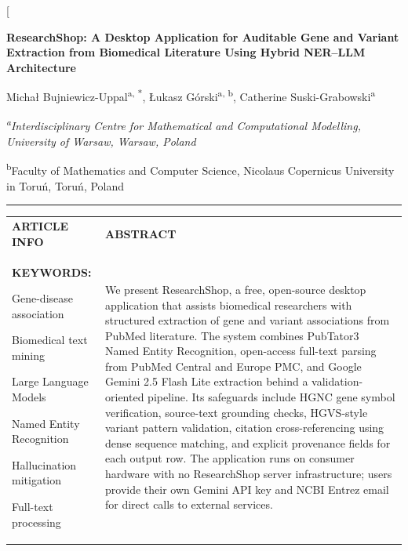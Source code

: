\documentclass[final,5p,times,twocolumn]{elsarticle}
\newcommand{\frontlabel}[1]{\textbf{\MakeUppercase{#1}}}
\newcommand{\frontspaced}[1]{\textbf{\MakeUppercase{#1}}}
\begin{document}
\makeatletter
\twocolumn[
\begin{@twocolumnfalse}
\vspace*{-0.7cm}
{\Large\bfseries ResearchShop: A Desktop Application for Auditable Gene and Variant Extraction from Biomedical Literature Using Hybrid NER--LLM Architecture\par}
\vspace{0.45em}
{\normalsize Micha{\l} Bujniewicz-Uppal\textsuperscript{a, *}, {\L}ukasz G\'{o}rski\textsuperscript{a, b}, Catherine Suski-Grabowski\textsuperscript{a}\par}
\vspace{0.25em}
{\footnotesize\itshape \textsuperscript{a}Interdisciplinary Centre for Mathematical and Computational Modelling, University of Warsaw, Warsaw, Poland\par
\textsuperscript{b}Faculty of Mathematics and Computer Science, Nicolaus Copernicus University in Toruń, Toruń, Poland\par}
\vspace{0.9em}
\hrule
\vspace{0.75em}
\noindent
{\footnotesize
\begin{tabularx}{\textwidth}{>{\raggedright\arraybackslash}p{} >{\raggedright\arraybackslash}X}
\frontspaced{Article Info} &
\frontspaced{Abstract} \\
\addlinespace[0.4em]
\frontlabel{Keywords:}\par
Gene-disease association\par
Biomedical text mining\par
Large Language Models\par
Named Entity Recognition\par
Hallucination mitigation\par
Full-text processing
&
We present ResearchShop, a free, open-source desktop application that assists biomedical researchers with structured extraction of gene and variant associations from PubMed literature. The system combines PubTator3 Named Entity Recognition, open-access full-text parsing from PubMed Central and Europe PMC, and Google Gemini 2.5 Flash Lite extraction behind a validation-oriented pipeline. Its safeguards include HGNC gene symbol verification, source-text grounding checks, HGVS-style variant pattern validation, citation cross-referencing using dense sequence matching, and explicit provenance fields for each output row. The application runs on consumer hardware with no ResearchShop server infrastructure; users provide their own Gemini API key and NCBI Entrez email for direct calls to external services.


\end{tabularx}}
\end{@twocolumnfalse}
\end{document}
